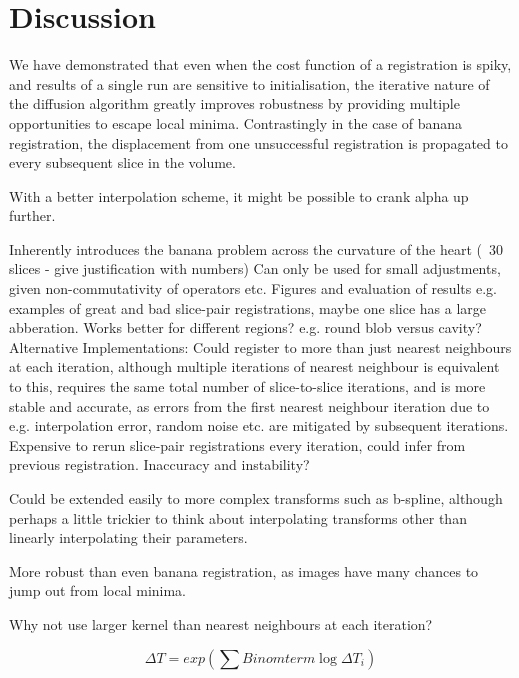 
\section{Discussion} %
\label{sec:discussion}
  We have demonstrated that even when the cost function of a registration is spiky, and results of a single run are sensitive to initialisation, the iterative nature of the diffusion algorithm greatly improves robustness by providing multiple opportunities to escape local minima. Contrastingly in the case of banana registration, the displacement from one unsuccessful registration is propagated to every subsequent slice in the volume.
  
  With a better interpolation scheme, it might be possible to crank alpha up further.
  
  Inherently introduces the banana problem across the curvature of the heart (~30 slices - give justification with numbers)
  Can only be used for small adjustments, given non-commutativity of operators etc.
  Figures and evaluation of results e.g. examples of great and bad slice-pair registrations, maybe one slice has a large abberation. Works better for different regions? e.g. round blob versus cavity?
  Alternative Implementations:
  Could register to more than just nearest neighbours at each iteration, although multiple iterations of nearest neighbour is equivalent to this, requires the same total number of slice-to-slice iterations, and is more stable and accurate, as errors from the first nearest neighbour iteration due to e.g. interpolation error, random noise etc. are mitigated by subsequent iterations.
  Expensive to rerun slice-pair registrations every iteration, could infer from previous registration. Inaccuracy and instability?
  
  Could be extended easily to more complex transforms such as b-spline, although perhaps a little trickier to think about interpolating transforms other than linearly interpolating their parameters.
  
  More robust than even banana registration, as images have many chances to jump out from local minima.
  
  Why not use larger kernel than nearest neighbours at each iteration?
  
  \begin{equation}
          \Delta T = exp \left( \sum Binom term \log \Delta T_i \right)
  \end{equation}
    
